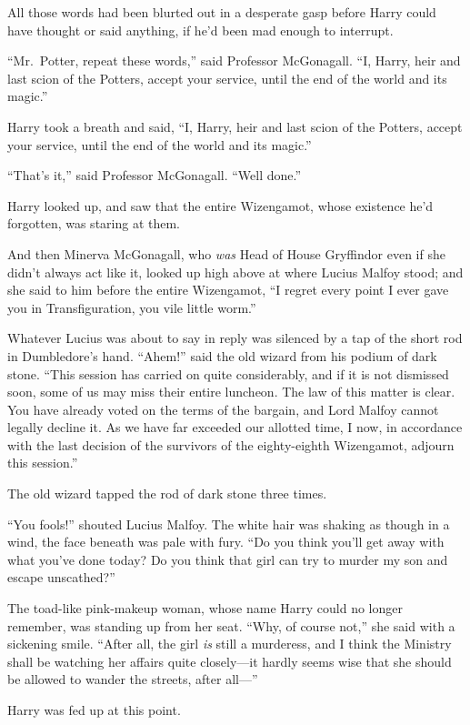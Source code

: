 All those words had been blurted out in a desperate gasp before Harry
could have thought or said anything, if he'd been mad enough to
interrupt.

``Mr.~Potter, repeat these words,'' said Professor McGonagall. ``I,
Harry, heir and last scion of the Potters, accept your service, until
the end of the world and its magic.''

Harry took a breath and said, ``I, Harry, heir and last scion of the
Potters, accept your service, until the end of the world and its
magic.''

``That's it,'' said Professor McGonagall. ``Well done.''

Harry looked up, and saw that the entire Wizengamot, whose existence
he'd forgotten, was staring at them.

And then Minerva McGonagall, who \emph{was} Head of House Gryffindor
even if she didn't always act like it, looked up high above at where
Lucius Malfoy stood; and she said to him before the entire Wizengamot,
``I regret every point I ever gave you in Transfiguration, you vile
little worm.''

Whatever Lucius was about to say in reply was silenced by a tap of the
short rod in Dumbledore's hand. ``Ahem!'' said the old wizard from his
podium of dark stone. ``This session has carried on quite considerably,
and if it is not dismissed soon, some of us may miss their entire
luncheon. The law of this matter is clear. You have already voted on the
terms of the bargain, and Lord Malfoy cannot legally decline it. As we
have far exceeded our allotted time, I now, in accordance with the last
decision of the survivors of the eighty-eighth Wizengamot, adjourn this
session.''

The old wizard tapped the rod of dark stone three times.

``You fools!'' shouted Lucius Malfoy. The white hair was shaking as
though in a wind, the face beneath was pale with fury. ``Do you think
you'll get away with what you've done today? Do you think that girl can
try to murder my son and escape unscathed?''

The toad-like pink-makeup woman, whose name Harry could no longer
remember, was standing up from her seat. ``Why, of course not,'' she
said with a sickening smile. ``After all, the girl \emph{is} still a
murderess, and I think the Ministry shall be watching her affairs quite
closely---it hardly seems wise that she should be allowed to wander the
streets, after all---''

Harry was fed up at this point.

